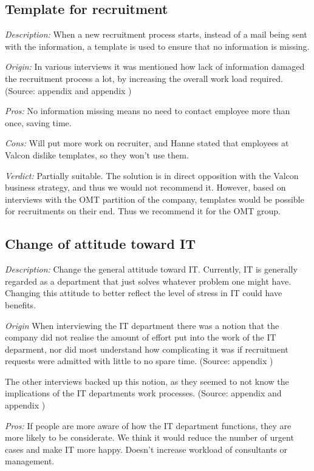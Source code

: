 \subsection{Template for recruitment}
\emph{Description:} When a new recruitment process starts, instead of a mail being sent with the information, a template is used to ensure that no information is missing.

\emph{Origin:}
In various interviews it was mentioned how lack of information damaged the recruitment process a lot, by increasing the overall work load required.
(Source: appendix  and appendix )

\noindent \emph{Pros:} No information missing means no need to contact employee more than once, saving time.

\noindent \emph{Cons:} Will put more work on recruiter, and Hanne stated that employees at Valcon dislike templates, so they won't use them.

\emph{Verdict:}
Partially suitable. The solution is in direct opposition with the Valcon business strategy, and thus we would not recommend it. However, based on interviews with the OMT partition of the company, templates would be possible for recruitments on their end. Thus we recommend it for the OMT group.

\subsection{Change of attitude toward IT}
\emph{Description:} Change the general attitude toward IT. Currently, IT is generally regarded as a department that just solves whatever problem one might have. Changing this attitude to better reflect the level of stress in IT could have benefits.

\emph{Origin}
When interviewing the IT department there was a notion that the company did not realise the amount of effort put into the work of the IT deparment, nor did most understand how complicating it was if recruitment requests were admitted with little to no spare time.
(Source: appendix )

The other interviews backed up this notion, as they seemed to not know the implications of the IT departments work processes.
(Source: appendix  and appendix )

\noindent \emph{Pros:} If people are more aware of how the IT department functions, they are more likely to be considerate. We think it would reduce the number of urgent cases and make IT more happy. Doesn't increase workload of consultants or management.

